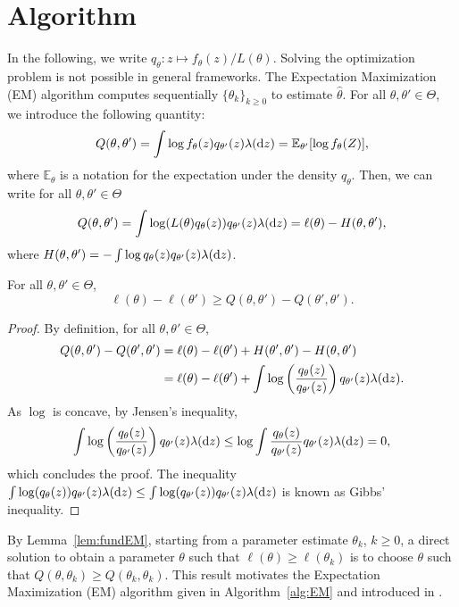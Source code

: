 \documentclass[english,graybox,envcountchap,envcountsame,sectrefs,shortlabels]{svmono}
\theoremstyle{style}
\newcommand{\eqsp}{}
\begin{document}
\section{Algorithm}
In the following, we write $q_\theta:z\mapsto f_\theta(z)/L(\theta)$. Solving the optimization problem is not possible in general frameworks. The Expectation Maximization (EM) algorithm computes sequentially $\{\theta_k\}_{k\geq 0}$ to estimate $\widehat \theta$. For all $\theta,\theta'\in\Theta$, we introduce the following quantity:
$$
Q(\theta,\theta') = \int \log f_\theta(z)q_{\theta'}(z)\lambda(\rmd z) = \mathbb{E}_{\theta'}[\log f_\theta(Z)]\eqsp,
$$
where $\mathbb{E}_{\theta}$ is a notation for the expectation under the density $q_\theta$. Then, we can write for all $\theta,\theta'\in\Theta$
$$
Q(\theta,\theta') = \int \log (L(\theta)q_\theta(z))q_{\theta'}(z)\lambda(\rmd z) = \ell(\theta) - H(\theta,\theta')\eqsp,
$$
where $H(\theta,\theta') = - \int \log q_\theta(z) q_{\theta'}(z)\lambda(\mathrm{d} z)$.

\begin{lemma}
\label{lem:fundEM}
For all $\theta,\theta'\in\Theta$,
$$
\ell(\theta)-\ell(\theta')\geq Q(\theta,\theta')-Q(\theta',\theta')\eqsp.
$$
\end{lemma}
\begin{proof}
By definition, for all $\theta,\theta'\in\Theta$,
\begin{align*}
Q(\theta,\theta')-Q(\theta',\theta') &= \ell(\theta)-\ell(\theta') + H(\theta',\theta') - H(\theta,\theta')\\
&= \ell(\theta)-\ell(\theta') + \int \log\left(\frac{q_\theta(z)}{q_{\theta'}(z)}\right)q_{\theta'}(z)\lambda(\rmd z)\eqsp.
\end{align*}
As $\log$ is concave, by Jensen's inequality, 
$$
\int \log\left(\frac{q_\theta(z)}{q_{\theta'}(z)}\right)q_{\theta'}(z)\lambda(\rmd z) \leq \log\int \frac{q_\theta(z)}{q_{\theta'}(z)}q_{\theta'}(z)\lambda(\rmd z) = 0\eqsp,
$$
which concludes the proof. The inequality $\int \log(q_\theta(z))q_{\theta'}(z)\lambda(\mathrm{d} z) \leq \int \log(q_{\theta'}(z))q_{\theta'}(z)\lambda(\mathrm{d} z)$ is known as Gibbs' inequality.
\end{proof}
By Lemma~\ref{lem:fundEM}, starting from a parameter estimate $\theta_k$, $k\geq 0$, a direct solution to obtain a parameter $\theta$ such that $\ell(\theta) \geq \ell(\theta_k)$ is to choose $\theta$ such that $Q(\theta,\theta_k)\geq Q(\theta_k,\theta_k)$. This result motivates the Expectation Maximization (EM) algorithm given in Algorithm~\ref{alg:EM} and introduced in \cite{dempster1977maximum}.
\end{document}
